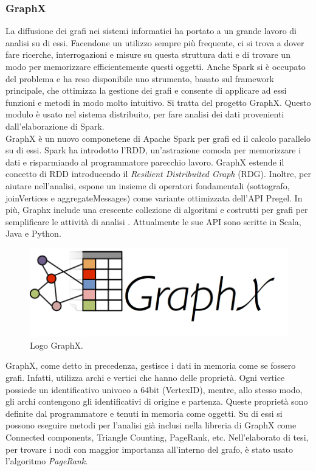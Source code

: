 \subsubsection{GraphX}
\label{sub:graphX}
La diffusione dei grafi nei sistemi informatici ha portato a un grande lavoro di analisi su di essi. Facendone un utilizzo sempre più frequente, ci si trova a dover fare ricerche, interrogazioni e misure su questa struttura dati e di trovare un modo per memorizzare efficientemente questi oggetti. Anche Spark si è occupato del problema e ha reso disponibile uno strumento, basato sul framework principale, che ottimizza la gestione dei grafi e consente di applicare ad essi funzioni e metodi in modo molto intuitivo. Si tratta del progetto GraphX. Questo modulo è usato nel sistema distribuito, per fare analisi dei dati provenienti dall'elaborazione di Spark.
\\GraphX è un nuovo componetene di Apache Spark per grafi ed il calcolo parallelo su di essi.  Spark ha introdotto l'RDD, un'astrazione comoda per memorizzare i dati e risparmiando al programmatore parecchio lavoro. GraphX estende il concetto di RDD introducendo il \textit{Resilient Distribuited Graph} (RDG). Inoltre, per aiutare nell'analisi, espone un insieme di operatori fondamentali (sottografo, joinVertices e aggregateMessages) come variante ottimizzata dell'API Pregel. In più, Graphx include una crescente collezione di algoritmi e costrutti per grafi per semplificare le attività di analisi \cite{spark:graphx}. Attualmente le sue API sono scritte in Scala, Java e Python.
\begin{figure}[H]
	\centering
	\includegraphics[width=\textwidth, height=0.15\textheight, keepaspectratio]{images/graphxLogo.png}
	\caption{Logo GraphX.}
	\label{fig:graphxLogo}
\end{figure}
GraphX, come detto in precedenza, gestisce i dati in memoria come se fossero grafi. Infatti, utilizza archi e vertici che hanno delle proprietà. Ogni vertice possiede un identificativo univoco a 64bit (VertexID), mentre, allo stesso modo, gli archi contengono gli identificativi di origine e partenza. Queste proprietà sono definite dal programmatore e tenuti in memoria come oggetti. Su di essi si possono eseguire metodi per l'analisi già inclusi nella libreria di GraphX come Connected components, Triangle Counting, PageRank, etc. Nell'elaborato di tesi, per trovare i nodi con maggior importanza all'interno del grafo, è stato usato l'algoritmo \textit{PageRank}.
